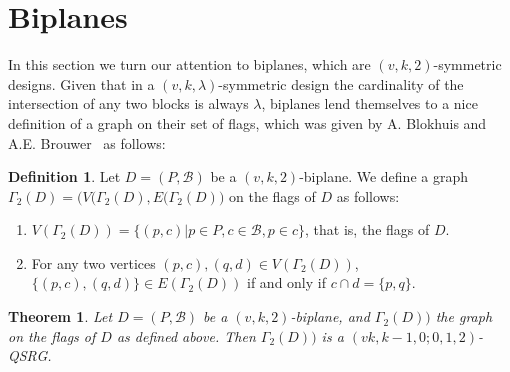 \documentclass[letterpaper,10pt]{article}
\theoremstyle{plain}
\newtheorem{thm}{Theorem}
\theoremstyle{definition}
\newtheorem{df}{Definition}
\begin{document}
\section{Biplanes}\label{bp}
 In this section we turn our attention to biplanes, which are $(v,k,2)$-symmetric designs. Given that in a $(v,k,\lambda)$-symmetric design the cardinality of the intersection of any two blocks is always $\lambda$, biplanes lend themselves to a nice definition of a graph on their set of flags, which was given by A. Blokhuis and A.E. Brouwer~\cite{BB} as follows:

\begin{df}
    Let $D=(P,\mathcal{B})$ be a $(v,k,2)$-biplane. We define a graph $\Gamma_2(D)=\big(V(\Gamma_2(D),E(\Gamma_2(D)\big)$ on the flags of $D$ as follows:
    \begin{enumerate}
        \item $V(\Gamma_2(D))=\{(p,c) |p\in P, c\in\mathcal{B}, p\in c\}$, that is, the flags of $D$.
        \item For any two vertices $(p,c),(q,d)\in V(\Gamma_2(D))$, $\{(p,c),(q,d)\}\in E(\Gamma_2(D))$ if and only if $c\cap d=\{p,q\}$.
    \end{enumerate}
\end{df}

\begin{thm}\label{t4}
    Let $D=(P,\mathcal{B})$ be a $(v,k,2)$-biplane, and $\Gamma_2(D))$ the graph on the flags of $D$ as defined above. Then $\Gamma_2(D))$ is a $(vk,k-1,0;0,1,2)$-QSRG.
\end{thm}
\end{document}
